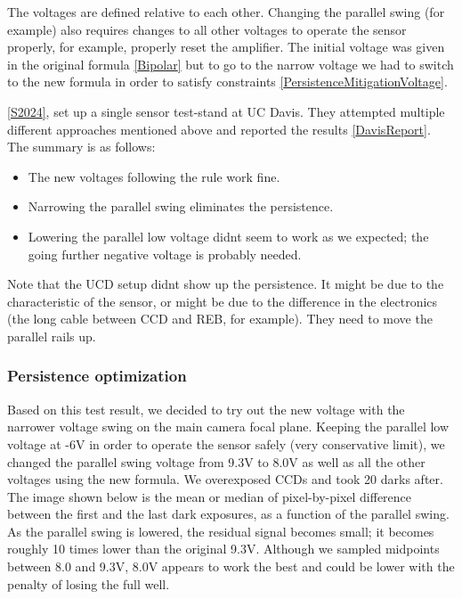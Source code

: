 The voltages are defined relative to each other. Changing the parallel
swing (for example) also requires changes to all other voltages to
operate the sensor properly, for example, properly reset the amplifier.
The initial voltage was given in the original formula
\hyperref[Bipolar]{{[}Bipolar{]}} but to go to the narrow voltage we had
to switch to the new formula in order to satisfy constraints
\hyperref[PersistenceMitigationVoltage]{{[}PersistenceMitigationVoltage{]}}.

\hyperref[S2024]{{[}S2024{]}}, set up a single sensor test-stand at UC
Davis. They attempted multiple different approaches mentioned above and
reported the results \hyperref[DavisReport]{{[}DavisReport{]}}. The
summary is as follows:

\begin{itemize}
\tightlist
\item
  The new voltages following the rule work fine.
\item
  Narrowing the parallel swing eliminates the persistence.
\item
  Lowering the parallel low voltage didn\textquotesingle t seem to work
  as we expected; the going further negative voltage is probably needed.
\end{itemize}

Note that the UCD setup didn\textquotesingle t show up the persistence.
It might be due to the characteristic of the sensor, or might be due to
the difference in the electronics (the long cable between CCD and REB,
for example). They need to move the parallel rails up.

\subsubsection{Persistence
optimization}\label{persistence-optimization-1}

Based on this test result, we decided to try out the new voltage with
the narrower voltage swing on the main camera focal plane. Keeping the
parallel low voltage at -6V in order to operate the sensor safely (very
conservative limit), we changed the parallel swing voltage from 9.3V to
8.0V as well as all the other voltages using the new formula. We
overexposed CCDs and took 20 darks after. The image shown below is the
mean or median of pixel-by-pixel difference between the first and the
last dark exposures, as a function of the parallel swing. As the
parallel swing is lowered, the residual signal becomes small; it becomes
roughly 10 times lower than the original 9.3V. Although we sampled
midpoints between 8.0 and 9.3V, 8.0V appears to work the best and could
be lower with the penalty of losing the full well.

